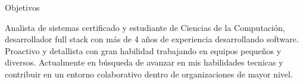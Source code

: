 \begin{rubric}{Objetivos}

\entry*Analista de sistemas certificado y estudiante de Ciencias de la Computación, desarrollador full stack con más de 4 años de experiencia desarrollando software. Proactivo y detallista con gran habilidad trabajando en equipos pequeños y diversos. Actualmente en búsqueda de avanzar en mis habilidades tecnicas y contribuir en un entorno colaborativo dentro de organizaciones de mayor nivel.
\end{rubric}